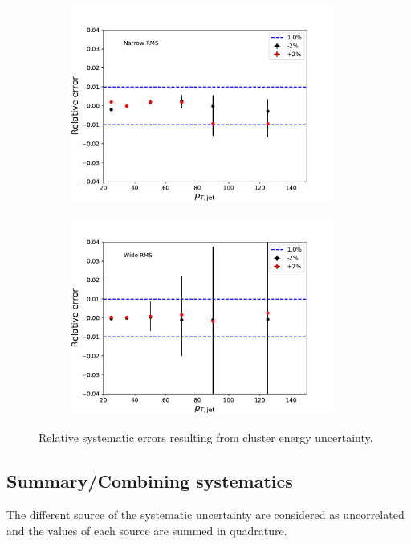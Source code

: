 \begin{figure}
\centering
\begin{subfigure}{0.45\textwidth}
\includegraphics[width=0.95\textwidth]{figures/systematics/SystematicErrorsGausRMS_Emcal.pdf}
\end{subfigure}
\begin{subfigure}{0.45\textwidth}
\includegraphics[width=0.95\textwidth]{figures/systematics/SystematicErrorsGammaRMS_Emcal.pdf}
\end{subfigure}
\caption{Relative systematic errors resulting from cluster energy uncertainty.}
\label{fig:systemcal2}
\end{figure}



\subsection{Summary/Combining systematics}
The different source of the systematic uncertainty are considered as uncorrelated and the values of each source are summed in quadrature.


